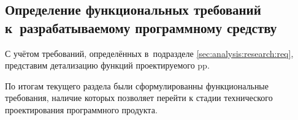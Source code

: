 \subsection{Определение функциональных требований к~разрабатываемому программному средству}
\label{sec:analysis:research:funcreq}

С учётом требований, определённых в~подразделе \ref{sec:analysis:research:req}, представим детализацию функций проектируемого \gls{pp}.








По итогам текущего раздела были сформулированны функциональные требования, наличие которых позволяет перейти к стадии технического проектирования программного продукта.



